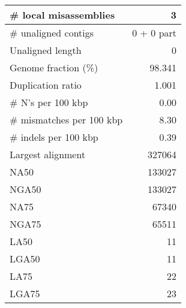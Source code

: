 \documentclass[12pt,a4paper]{article}
\begin{document}
\begin{table}[ht]
\begin{center}
\begin{tabular}{|l*{1}{|r}|}
\# local misassemblies & 3 \\ \hline
\# unaligned contigs & 0 + 0 part \\ \hline
Unaligned length & 0 \\ \hline
Genome fraction (\%) & 98.341 \\ \hline
Duplication ratio & 1.001 \\ \hline
\# N's per 100 kbp & 0.00 \\ \hline
\# mismatches per 100 kbp & 8.30 \\ \hline
\# indels per 100 kbp & 0.39 \\ \hline
Largest alignment & 327064 \\ \hline
NA50 & 133027 \\ \hline
NGA50 & 133027 \\ \hline
NA75 & 67340 \\ \hline
NGA75 & 65511 \\ \hline
LA50 & 11 \\ \hline
LGA50 & 11 \\ \hline
LA75 & 22 \\ \hline
LGA75 & 23 \\ \hline
\end{tabular}
\end{center}
\end{table}
\end{document}
